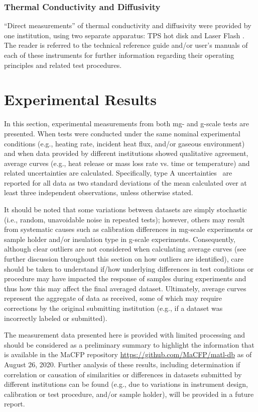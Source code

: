 \documentclass{book}
\begin{document}
\subsection{Thermal Conductivity and Diffusivity}

``Direct measurements'' of thermal conductivity and diffusivity were provided by one institution, using two separate apparatus: TPS hot disk \cite{gustafsson1991transient} and Laser Flash \cite{NeztschLFA}. The reader is referred to the technical reference guide and/or user’s manuals of each of these instruments for further information regarding their operating principles and related test procedures.



\chapter{Experimental Results}

In this section, experimental measurements from both mg- and g-scale tests are presented. When tests were conducted under the same nominal experimental conditions (e.g., heating rate, incident heat flux, and/or gaseous environment) and when data provided by different institutions showed qualitative agreement, average curves (e.g., heat release or mass loss rate vs. time or temperature) and related uncertainties are calculated. Specifically, type A uncertainties~\cite{taylor1994nist} are reported for all data as two standard deviations of the mean calculated over at least three independent observations, unless otherwise stated.

It should be noted that some variations between datasets are simply stochastic (i.e., random, unavoidable noise in repeated tests); however, others may result from systematic causes such as calibration differences in mg-scale experiments or sample holder and/or insulation type in g-scale experiments. Consequently, although clear outliers are not considered when calculating average curves (see further discussion throughout this section on how outliers are identified), care should be taken to understand if/how underlying differences in test conditions or procedure may have impacted the response of samples during experiments and thus how this may affect the final averaged dataset. Ultimately, average curves represent the aggregate of data as received, some of which may require corrections by the original submitting institution (e.g., if a dataset was incorrectly labeled or submitted).

The measurement data presented here is provided with limited processing and should be considered as a preliminary summary to highlight the information that is available in the MaCFP repository \href{https://github.com/MaCFP/matl-db}{https://github.com/MaCFP/matl-db} as of August 26, 2020. Further analysis of these results, including determination if correlation or causation of similarities or differences in datasets submitted by different institutions can be found (e.g., due to variations in instrument design, calibration or test procedure, and/or sample holder), will be provided in a future report.
\end{document}
